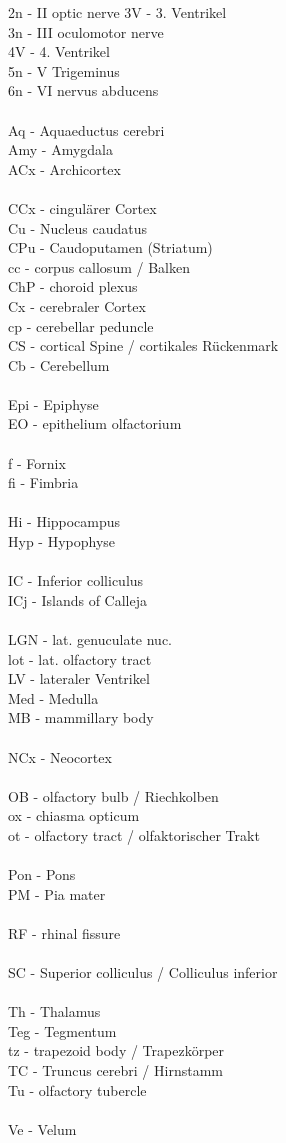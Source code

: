 \documentclass[12pt,a4paper,pdftex]{article}
\begin{document}
2n - II optic nerve
3V - 3. Ventrikel\\
3n - III oculomotor nerve\\
4V - 4. Ventrikel\\
5n - V Trigeminus\\
6n - VI nervus abducens\\
\\
Aq - Aquaeductus cerebri\\
Amy - Amygdala\\
ACx - Archicortex\\
\\
CCx - cingulärer Cortex\\
Cu - Nucleus caudatus\\
CPu - Caudoputamen (Striatum)\\
cc - corpus callosum / Balken\\
ChP - choroid plexus\\
Cx - cerebraler Cortex\\
cp - cerebellar peduncle\\
CS - cortical Spine / cortikales Rückenmark\\
Cb - Cerebellum\\
\\
Epi - Epiphyse\\
EO - epithelium olfactorium\\
\\
f - Fornix\\
fi - Fimbria\\
\\
Hi - Hippocampus\\
Hyp - Hypophyse\\
\\
IC - Inferior colliculus\\
ICj - Islands of Calleja\\
\\
LGN - lat. genuculate nuc.\\
lot - lat. olfactory tract\\
LV - lateraler Ventrikel
\\
Med - Medulla\\
MB - mammillary body\\
\\
NCx - Neocortex\\
\\
OB - olfactory bulb / Riechkolben\\
ox - chiasma opticum\\
ot - olfactory tract / olfaktorischer Trakt\\
\\
Pon - Pons\\
PM - Pia mater\\
\\
RF - rhinal fissure\\
\\
SC - Superior colliculus / Colliculus inferior\\
\\
Th - Thalamus\\
Teg - Tegmentum\\
tz - trapezoid body / Trapezkörper\\
TC - Truncus cerebri / Hirnstamm\\
Tu - olfactory tubercle\\
\\
Ve - Velum\\
\\
\end{document}
